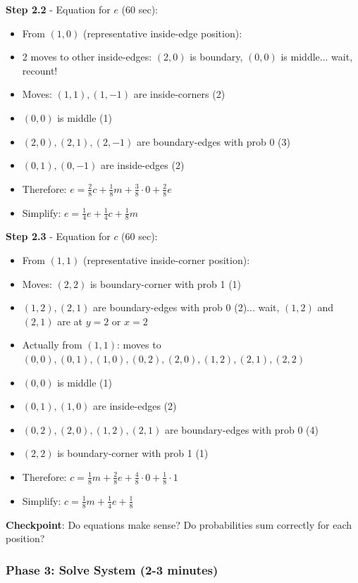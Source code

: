 \documentclass[12pt]{article}
\begin{document}
\begin{roadmapbox}
\textbf{Step 2.2} - Equation for $e$ (60 sec):
\begin{itemize}[leftmargin=*]
    \item From $(1,0)$ (representative inside-edge position):
    \item 2 moves to other inside-edges: $(2,0)$ is boundary, $(0,0)$ is middle... wait, recount!
    \item Moves: $(1,1), (1,-1)$ are inside-corners (2)
    \item $(0,0)$ is middle (1)
    \item $(2,0), (2,1), (2,-1)$ are boundary-edges with prob 0 (3)
    \item $(0,1), (0,-1)$ are inside-edges (2)
    \item Therefore: $e = \frac{2}{8}c + \frac{1}{8}m + \frac{3}{8} \cdot 0 + \frac{2}{8}e$
    \item Simplify: $e = \frac{1}{4}e + \frac{1}{4}c + \frac{1}{8}m$
\end{itemize}

\textbf{Step 2.3} - Equation for $c$ (60 sec):
\begin{itemize}[leftmargin=*]
    \item From $(1,1)$ (representative inside-corner position):
    \item Moves: $(2,2)$ is boundary-corner with prob 1 (1)
    \item $(1,2), (2,1)$ are boundary-edges with prob 0 (2)... wait, $(1,2)$ and $(2,1)$ are at $y=2$ or $x=2$
    \item Actually from $(1,1)$: moves to $(0,0), (0,1), (1,0), (0,2), (2,0), (1,2), (2,1), (2,2)$
    \item $(0,0)$ is middle (1)
    \item $(0,1), (1,0)$ are inside-edges (2)  
    \item $(0,2), (2,0), (1,2), (2,1)$ are boundary-edges with prob 0 (4)
    \item $(2,2)$ is boundary-corner with prob 1 (1)
    \item Therefore: $c = \frac{1}{8}m + \frac{2}{8}e + \frac{4}{8} \cdot 0 + \frac{1}{8} \cdot 1$
    \item Simplify: $c = \frac{1}{8}m + \frac{1}{4}e + \frac{1}{8}$
\end{itemize}

\textbf{Checkpoint}: Do equations make sense? Do probabilities sum correctly for each position?

\subsubsection*{Phase 3: Solve System (2-3 minutes)}


\end{roadmapbox}
\end{document}
